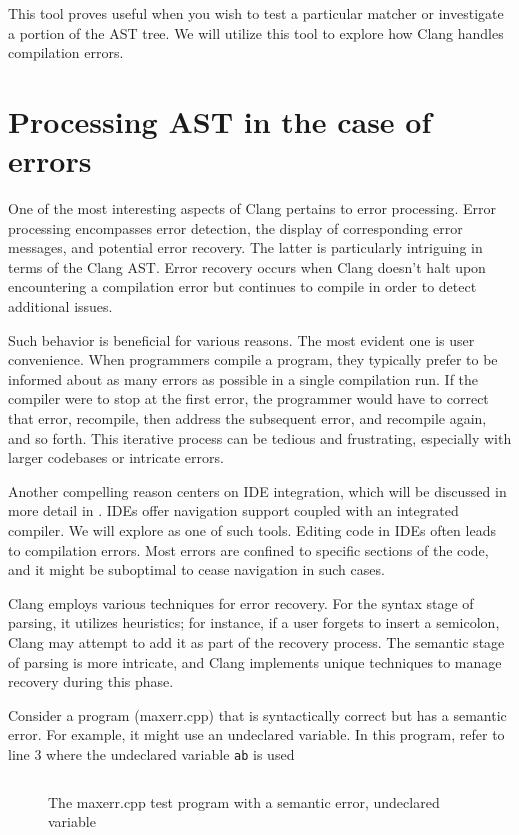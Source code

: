 This tool proves useful when you wish to test a particular matcher or
investigate a portion of the AST tree. We will utilize this tool to explore
how Clang handles compilation errors. 

\section{Processing AST in the case of errors}
One of the most interesting aspects of Clang pertains to error processing. Error
processing encompasses error detection, the display of corresponding error
messages, and potential error recovery. The latter is particularly intriguing in
terms of the Clang AST. Error recovery occurs when Clang doesn't halt upon
encountering a compilation error but continues to compile in order to detect
additional issues. 

Such behavior is beneficial for various reasons. The most evident one is user
convenience. When programmers compile a program, they typically prefer to be
informed about as many errors as possible in a single compilation run. If the
compiler were to stop at the first error, the programmer would have to correct
that error, recompile, then address the subsequent error, and recompile again,
and so forth. This iterative process can be tedious and frustrating, especially
with larger codebases or intricate errors. 

Another compelling reason centers on IDE integration, which will be discussed in
more detail in . IDEs offer navigation support coupled with
an integrated compiler. We will explore  as one of such
tools. Editing code in IDEs often leads to compilation errors. Most errors are
confined to specific sections of the code, and it might be suboptimal to cease
navigation in such cases. 

Clang employs various techniques for error recovery. For the syntax stage of
parsing, it utilizes heuristics; for instance, if a user forgets to insert a
semicolon, Clang may attempt to add it as part of the recovery process. The
semantic stage of parsing is more intricate, and Clang implements unique
techniques to manage recovery during this phase. 

Consider a program (maxerr.cpp) that is syntactically correct but has a semantic
error. For example, it might use an undeclared variable. In this program, refer
to line 3 where the undeclared variable \texttt{ab} is used 
\begin{figure}[H]
  \inputminted{c++}{src/part1/ch3_ast/maxerr.cpp}
  \caption{The maxerr.cpp test program with a semantic error, undeclared
    variable} 
  \label{lis:min:maxerr}
\end{figure}

